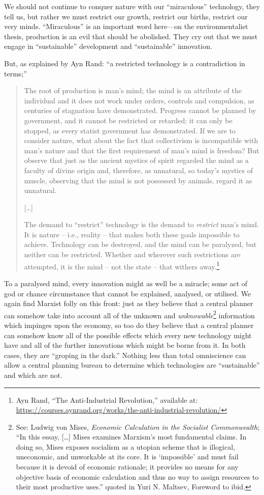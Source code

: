 \documentclass[11pt]{article}
\begin{document}
We should not continue to conquer nature with our ``miraculous'' technology, they tell us, but rather we must restrict our growth, restrict our births, restrict our very minds. ``Miraculous'' is an important word here---on the environmentalist thesis, production is an evil that should be abolished. They cry out that we must engage in ``sustainable'' development and ``sustainable'' innovation.

But, as explained by Ayn Rand: ``a restricted technology is a contradiction in terms;''
\begin{quote}
The root of production is man's mind; the mind is an attribute of the individual and it does not work under orders, controls and compulsion, as centuries of stagnation have demonstrated. Progress cannot be planned by government, and it cannot be restricted or retarded; it can only be stopped, as every statist government has demonstrated. If we are to consider nature, what about the fact that collectivism is incompatible with man's nature and that the first requirement of man's mind is freedom? But observe that just as the ancient mystics of spirit regarded the mind as a faculty of divine origin and, therefore, as unnatural, so today’s mystics of muscle, observing that the mind is not possessed by animals, regard it as unnatural.

[\ldots{}]

The demand to ``restrict'' technology is the demand to \emph{restrict} man's mind. It is nature -- i.e., reality -- that makes both these goals impossible to achieve. Technology can be destroyed, and the mind can be paralyzed, but neither can be restricted. Whether and wherever such restrictions are attempted, it is the mind -- not the state -- that withers away.\footnote{Ayn Rand, ``The Anti-Industrial Revolution,'' available at: \url{https://courses.aynrand.org/works/the-anti-industrial-revolution/}}
\end{quote}

To a paralysed mind, every innovation might as well be a miracle; some act of god or chance circumstance that cannot be explained, analysed, or utilised. We again find Marxist folly on this front: just as they believe that a central planner can somehow take into account all of the unknown and \emph{unknowable}\footnote{See: Ludwig von Mises, \emph{Economic Calculation in the Socialist Commonwealth}; ``In this essay, [\ldots{}] Mises examines Marxism’s most fundamental claims. In doing so, Mises exposes socialism as a utopian scheme that is illogical, uneconomic, and unworkable at its core. It is `impossible' and must fail because it is devoid of economic rationale; it provides no means for any objective basis of economic calculation and thus no way to assign resources to their most productive uses.'' quoted in Yuri N. Maltsev, Foreword to ibid.} information which impinges upon the economy, so too do they believe that a central planner can somehow know all of the possible effects which every new technology might have and all of the further innovations which might be borne from it. In both cases, they are ``groping in the dark.'' Nothing less than total omniscience can allow a central planning bureau to determine which technologies are ``sustainable'' and which are not.
\end{document}
